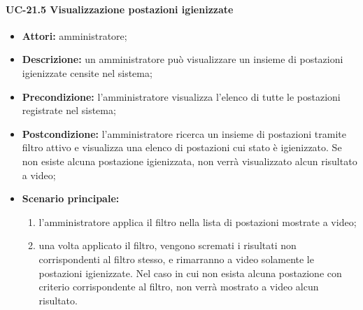 \paragraph{UC-21.5 Visualizzazione postazioni igienizzate}
\begin{itemize}
    \item \textbf{Attori:} amministratore;
    \item \textbf{Descrizione:} un amministratore pu\`{o} visualizzare un insieme di postazioni igienizzate censite nel sistema;
    \item \textbf{Precondizione:} l'amministratore visualizza l'elenco di tutte le postazioni registrate nel sistema;
    \item \textbf{Postcondizione:} l'amministratore ricerca un insieme di postazioni tramite filtro attivo e visualizza una elenco di postazioni cui stato è igienizzato. Se non esiste alcuna postazione igienizzata, non verrà visualizzato alcun risultato a video;
    \item \textbf{Scenario principale:}
    \begin{enumerate}
        \item l'amministratore applica il filtro nella lista di postazioni mostrate a video;
        \item una volta applicato il filtro, vengono scremati i risultati non corrispondenti al filtro stesso, e rimarranno a video solamente le postazioni igienizzate. Nel caso in cui non esista alcuna postazione con criterio corrispondente al filtro, non verrà mostrato a video alcun risultato.
    \end{enumerate}
\end{itemize}

